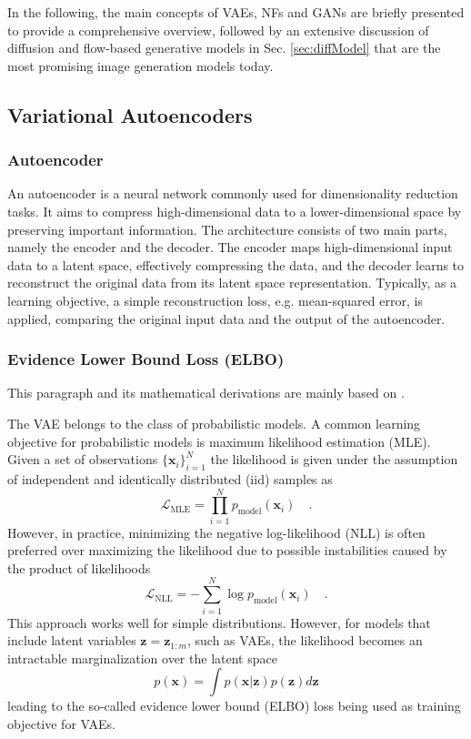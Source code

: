 In the following, the main concepts of \gls{VAE}s, \gls{NF}s and \gls{GAN}s are briefly presented to provide a comprehensive overview, followed by an extensive discussion of diffusion and flow-based generative models in Sec. \ref{sec:diffModel} that are the most promising image generation models today.


\subsection{Variational Autoencoders}
\label{VariationaAutoEncoder}
\subsubsection{Autoencoder}
An autoencoder \cite{AE} is a neural network commonly used for dimensionality reduction tasks. It aims to compress high-dimensional data to a lower-dimensional space by preserving important information. The architecture consists of two main parts, namely the encoder and the decoder. The encoder maps high-dimensional input data to a latent space, effectively compressing the data, and the decoder learns to reconstruct the original data from its latent space representation. Typically, as a learning objective, a simple reconstruction loss, e.g. mean-squared error, is applied, comparing the original input data and the output of the autoencoder. 

\subsubsection{Evidence Lower Bound Loss (\gls{ELBO})}
This paragraph and its mathematical derivations are mainly based on \cite{ELBO, VAE}.


The \gls{VAE} \cite{VAE} belongs to the class of probabilistic models. A common learning objective for probabilistic models is maximum likelihood estimation (\gls{MLE}). Given a set of observations $\lbrace \textbf{x}_i \rbrace_{i=1}^N$
 the likelihood is given under the assumption of independent and identically distributed (\gls{iid}) samples as
\begin{equation}
     \mathcal{L}_{\text{MLE}} = \prod_{i=1}^N p_{\text{model}}(\textbf{x}_i) \quad.
\end{equation}
However, in practice, minimizing the negative log-likelihood (\gls{NLL}) is often preferred over maximizing the likelihood due to possible instabilities caused by the product of likelihoods
\begin{equation}
    \mathcal{L}_{\text{NLL}} = - \sum_{i=1}^N \log{p_{\text{model}}(\textbf{x}_i)} \quad.
\end{equation}
This approach works well for simple distributions. However, for models that include latent variables $\textbf{z}=\textbf{z}_{1:m}$, such as \gls{VAE}s, the likelihood becomes an intractable marginalization over the latent space
\begin{equation}
    p(\textbf{x}) = \int p(\textbf{x} |\textbf{z}) p(\textbf{z})d\textbf{z}
\end{equation}
leading to the so-called evidence lower bound (\gls{ELBO}) loss \cite{ELBO} being used as training objective for \gls{VAE}s. 

